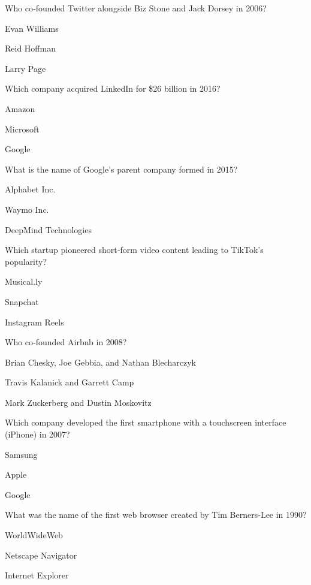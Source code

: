 \begin{enhancedmcq}{Who co‑founded Twitter alongside Biz Stone and Jack Dorsey in 2006?}
\item Evan Williams
\item Reid Hoffman
\item Larry Page

\end{enhancedmcq}
\begin{enhancedmcq}{Which company acquired LinkedIn for \$26 billion in 2016?}
\item Amazon
\item Microsoft
\item Google

\end{enhancedmcq}
\begin{enhancedmcq}{What is the name of Google's parent company formed in 2015?}
\item Alphabet Inc.
\item Waymo Inc.
\item DeepMind Technologies

\end{enhancedmcq}
\begin{enhancedmcq}{Which startup pioneered short‑form video content leading to TikTok's popularity?}
\item Musical.ly
\item Snapchat
\item Instagram Reels

\end{enhancedmcq}
\begin{enhancedmcq}{Who co‑founded Airbnb in 2008?}
\item Brian Chesky, Joe Gebbia, and Nathan Blecharczyk
\item Travis Kalanick and Garrett Camp
\item Mark Zuckerberg and Dustin Moskovitz

\end{enhancedmcq}
\begin{enhancedmcq}{Which company developed the first smartphone with a touchscreen interface (iPhone) in 2007?}
\item Samsung
\item Apple
\item Google

\end{enhancedmcq}
\begin{enhancedmcq}{What was the name of the first web browser created by Tim Berners‑Lee in 1990?}
\item WorldWideWeb
\item Netscape Navigator
\item Internet Explorer

\end{enhancedmcq}
